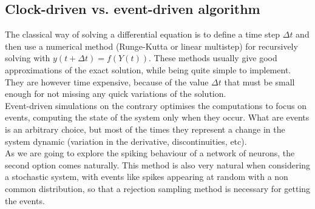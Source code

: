 \documentclass{article}
\begin{document}
	\subsection{Clock-driven vs. event-driven algorithm}
		\indent The classical way of solving a differential equation is to define a time step $\Delta t$ and then use a numerical method (Runge-Kutta or linear multistep) for recursively solving with $y(t+\Delta t)=f(Y(t))$. These methods usually give good approximations of the exact solution, while being quite simple to implement. They are however time expensive, because of the value $\Delta t$ that must be small enough for not missing any quick variations of the solution.\\\indent
		Event-driven simulations on the contrary optimises the computations to focus on events, computing the state of the system only when they occur. What are events is an arbitrary choice, but most of the times they represent a change in the system dynamic (variation in the derivative, discontinuities, etc).\\\indent
		As we are going to explore the spiking behaviour of a network of neurons, the second option comes naturally. This method is also very natural when considering a stochastic system, with events like spikes appearing at random with a non common distribution, so that a rejection sampling method is necessary for getting the events.\\\indent
\end{document}
